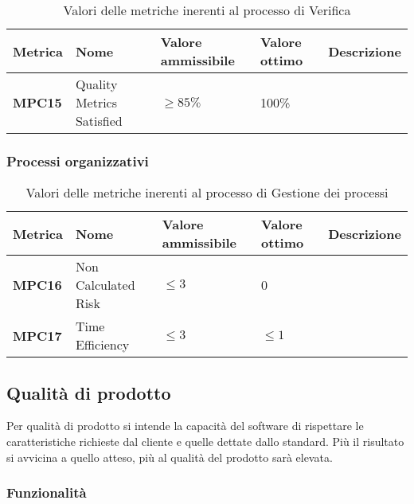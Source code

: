 \documentclass[italian,12pt]{article} %
\begin{document}

\begin{table}[h!]
	\centering
	\begin{tabularx}{\textwidth}{|X|X|X|X|X|} 	 
		\hline
		\textbf{Metrica} 	& \textbf{Nome} & \textbf{Valore ammissibile} & \textbf{Valore ottimo} & \textbf{Descrizione}\\  	 
		\hline
		\textbf{MPC15} & Quality Metrics Satisfied & $\geq 85\% $ & 100\% &\\
		\hline
	\end{tabularx}
	\caption{ Valori delle metriche inerenti al processo di Verifica}
	\label{table:5}
\end{table}

\subsubsection{Processi organizzativi}


\begin{table}[h!]
	\centering
	\begin{tabularx}{\textwidth}{|X|X|X|X|X|} 	 
		\hline
		\textbf{Metrica} 	& \textbf{Nome} & \textbf{Valore ammissibile} & \textbf{Valore ottimo} & \textbf{Descrizione}\\  	 
		\hline
		\textbf{MPC16} & Non Calculated Risk & $\leq 3 $ & 0 &\\
		\hline
		\textbf{MPC17} & Time Efficiency & $\leq 3 $ & $\leq 1 $ &\\
		\hline
	\end{tabularx}
	\caption{ Valori delle metriche inerenti al processo di Gestione dei processi}
	\label{table:6}
\end{table}


\subsection{Qualità di prodotto}

Per qualità di prodotto si intende la capacità del software di rispettare 
le caratteristiche richieste dal cliente e quelle dettate dallo standard.
Più il risultato si avvicina a quello atteso, più al qualità del prodotto
sarà elevata. 

\subsubsection{Funzionalità}
\end{document}
